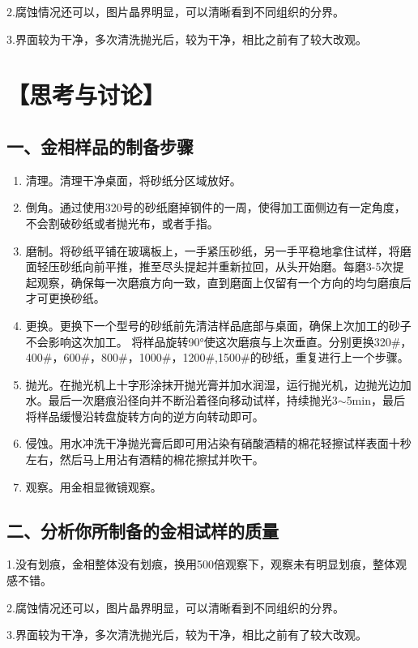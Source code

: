 \documentclass[a4paper,utf8]{article}
\begin{document}
2.腐蚀情况还可以，图片晶界明显，可以清晰看到不同组织的分界。

3.界面较为干净，多次清洗抛光后，较为干净，相比之前有了较大改观。

\section*{【思考与讨论】}

\subsection*{一、金相样品的制备步骤}
    \begin{enumerate}
        \item 清理。清理干净桌面，将砂纸分区域放好。
        \item 倒角。通过使用320号的砂纸磨掉钢件的一周，使得加工面侧边有一定角度，不会割破砂纸或者抛光布，或者手指。
        \item 磨制。将砂纸平铺在玻璃板上，一手紧压砂纸，另一手平稳地拿住试样，将磨面轻压砂纸向前平推，推至尽头提起并重新拉回，从头开始磨。每磨3-5次提起观察，确保每一次磨痕方向一致，直到磨面上仅留有一个方向的均匀磨痕后才可更换砂纸。
        \item 更换。更换下一个型号的砂纸前先清洁样品底部与桌面，确保上次加工的砂子不会影响这次加工。
        将样品旋转90°使这次磨痕与上次垂直。分别更换320\#，400\#，600\#，800\#，1000\#，1200\#,1500\#的砂纸，重复进行上一个步骤。
        \item 抛光。在抛光机上十字形涂抹开抛光膏并加水润湿，运行抛光机，边抛光边加水。最后一次磨痕沿径向并不断沿着径向移动试样，持续抛光3$\sim $5min，最后将样品缓慢沿转盘旋转方向的逆方向转动即可。
        \item 侵蚀。用水冲洗干净抛光膏后即可用沾染有硝酸酒精的棉花轻擦试样表面十秒左右，然后马上用沾有酒精的棉花擦拭并吹干。
        \item 观察。用金相显微镜观察。
    \end{enumerate}

\subsection*{二、分析你所制备的金相试样的质量}

1.没有划痕，金相整体没有划痕，换用500倍观察下，观察未有明显划痕，整体观感不错。

2.腐蚀情况还可以，图片晶界明显，可以清晰看到不同组织的分界。

3.界面较为干净，多次清洗抛光后，较为干净，相比之前有了较大改观。
\end{document}
